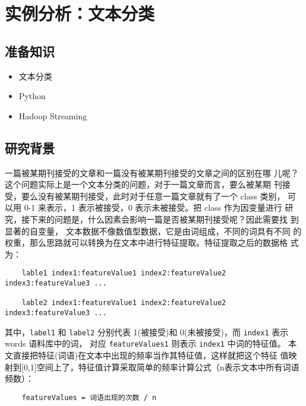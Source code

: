 \section{实例分析：文本分类}\label{ux5b9eux4f8bux5206ux6790ux6587ux672cux5206ux7c7b}

\subsection{准备知识}\label{ux51c6ux5907ux77e5ux8bc6}

\begin{itemize}
\itemsep1pt\parskip0pt
\item
  文本分类
\item
  Python
\item
  Hadoop Streaming
\end{itemize}

\subsection{研究背景}\label{ux7814ux7a76ux80ccux666f}

一篇被某期刊接受的文章和一篇没有被某期刊接受的文章之间的区别在哪
儿呢？这个问题实际上是一个文本分类的问题，对于一篇文章而言，要么被某期
刊接受，要么没有被某期刊接受，此时对于任意一篇文章就有了一个 class 类别，
可以用 0-1 来表示，1 表示被接受，0 表示未被接受。把 class 作为因变量进行
研究，接下来的问题是，什么因素会影响一篇是否被某期刊接受呢？因此需要找
到显著的自变量， 文本数据不像数值型数据，它是由词组成，不同的词具有不同
的权重，那么思路就可以转换为在文本中进行特征提取。特征提取之后的数据格
式为：

\begin{lstlisting}
	lable1 index1:featureValue1 index2:featureValue2 index3:featureValue3 ...

	lable2 index1:featureValue1 index2:featureValue2 index3:featureValue3 ...
\end{lstlisting}

其中，\lstinline|label1| 和 \lstinline|label2| 分别代表 1(被接受)和 0(未被接受)，而 \lstinline!index1! 表示
words 语料库中的词， 对应 \lstinline|featureValues1| 则表示 \lstinline|index1| 中词的特征值。
本文直接把特征(词语)在文本中出现的频率当作其特征值，这样就把这个特征
值映射到{[}0,1{]}空间上了，特征值计算采取简单的频率计算公式（n表示文本中所有词语频数）：

\begin{lstlisting}
	featureValues = 词语出现的次数 / n
\end{lstlisting}

